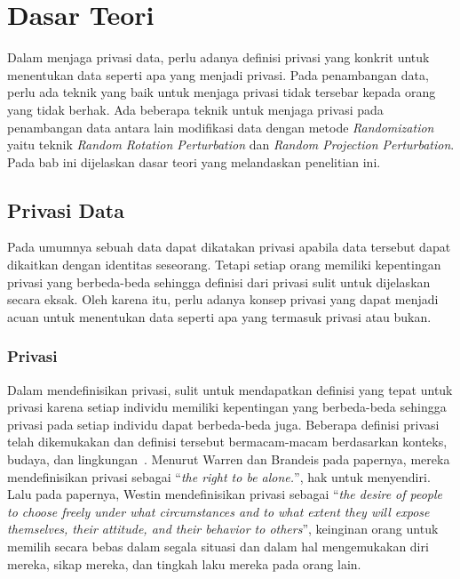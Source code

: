 \chapter{Dasar Teori}
\label{chap:teori}

Dalam menjaga privasi data, perlu adanya definisi privasi yang konkrit untuk menentukan data seperti apa yang menjadi privasi. Pada penambangan data, perlu ada teknik yang baik untuk menjaga privasi tidak tersebar kepada orang yang tidak berhak. Ada beberapa teknik untuk menjaga privasi pada penambangan data antara lain modifikasi data dengan metode \textit{Randomization} yaitu teknik \textit{Random Rotation Perturbation} dan \textit{Random Projection Perturbation}. Pada bab ini dijelaskan dasar teori yang melandaskan penelitian ini.

\section{Privasi Data}
\label{sec:privasidata} 

Pada umumnya sebuah data dapat dikatakan privasi apabila data tersebut dapat dikaitkan dengan identitas seseorang. Tetapi setiap orang memiliki kepentingan privasi yang berbeda-beda sehingga definisi dari privasi sulit untuk dijelaskan secara eksak. Oleh karena itu, perlu adanya konsep privasi yang dapat menjadi acuan untuk menentukan data seperti apa yang termasuk privasi atau bukan.

\subsection{Privasi}
\label{subsec:privasi}

Dalam mendefinisikan privasi, sulit untuk mendapatkan definisi yang tepat untuk privasi karena setiap individu memiliki kepentingan yang berbeda-beda sehingga privasi pada setiap individu dapat berbeda-beda juga. Beberapa definisi privasi telah dikemukakan dan definisi tersebut bermacam-macam berdasarkan konteks, budaya, dan lingkungan~\cite{stanleyosmar:04:standardppdm}. Menurut Warren dan Brandeis pada papernya, mereka mendefinisikan privasi sebagai “\textit{the right to be alone.}”, hak untuk menyendiri. Lalu pada papernya, Westin mendefinisikan privasi sebagai “\textit{the desire of people to choose freely under what circumstances and to what extent they will expose themselves, their attitude, and their behavior to others}”, keinginan orang untuk memilih secara bebas dalam segala situasi dan dalam hal mengemukakan diri mereka, sikap mereka, dan tingkah laku mereka pada orang lain. 


